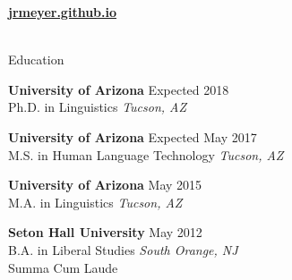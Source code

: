 \documentclass{resume} %
\begin{document}
\vspace{-.25cm}
\begin{center}
  \href{https://jrmeyer.github.io}{\textbf{jrmeyer.github.io}} \\
  \href{https://github.com/JRMeyer}{\faGithub} \\
\end{center}


\vspace{1.0cm}


\vspace{.5cm}
\begin{rSection}{Education}

{\bf University of Arizona} \hfill {Expected 2018} \\ 
Ph.D. in Linguistics \hfill {\em Tucson, AZ}

\vspace{.25cm}

{\bf University of Arizona} \hfill {Expected May 2017} \\ 
M.S. in Human Language Technology \hfill {\em Tucson, AZ}

\vspace{.25cm}

{\bf University of Arizona} \hfill {May 2015} \\ 
M.A. in Linguistics \hfill {\em Tucson, AZ}

\vspace{.25cm}

{\bf Seton Hall University} \hfill {May 2012} \\ 
B.A. in Liberal Studies  \hfill {\em South Orange, NJ} \\
Summa Cum Laude \\



\end{rSection}
\end{document}
